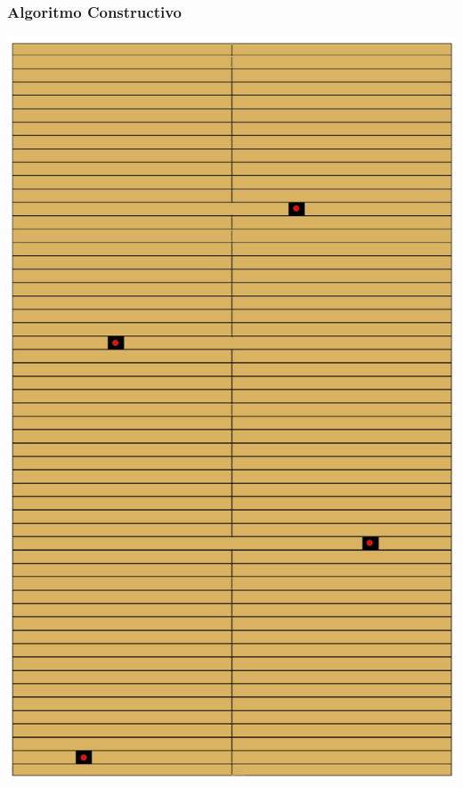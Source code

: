 \begin{frame}
    \frametitle{Algoritmo Constructivo}
    \endblock{}
		\begin{center}
    \includegraphics[height=0.8\textheight]{FIGURES/CSU-puntos}
		\end{center}
\end{frame}

